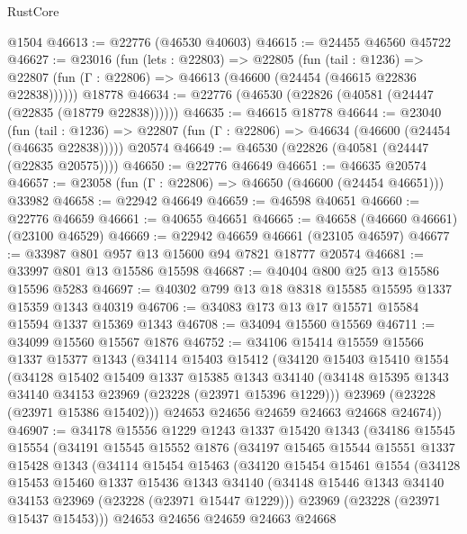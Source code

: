 \begin{lexlean}{RustCore}
\begin{coremodule}
    @1504
@46613 := @22776 (@46530 @40603)
@46615 := @24455 @46560 @45722
@46627 := @23016
    (fun (lets : @22803) =>
    @22805
      (fun (tail : @1236) =>
      @22807 (fun (Γ : @22806) => @46613 (@46600 (@24454 (@46615 @22836 @22838))))))
    @18778
@46634 := @22776 (@46530 (@22826 (@40581 (@24447 (@22835 (@18779 @22838))))))
@46635 := @46615 @18778
@46644 := @23040
    (fun (tail : @1236) => @22807 (fun (Γ : @22806) => @46634 (@46600 (@24454 (@46635 @22838)))))
    @20574
@46649 := @46530 (@22826 (@40581 (@24447 (@22835 @20575))))
@46650 := @22776 @46649
@46651 := @46635 @20574
@46657 := @23058 (fun (Γ : @22806) => @46650 (@46600 (@24454 @46651))) @33982
@46658 := @22942 @46649
@46659 := @46598 @40651
@46660 := @22776 @46659
@46661 := @40655 @46651
@46665 := @46658 (@46660 @46661) (@23100 @46529)
@46669 := @22942 @46659 @46661 (@23105 @46597)
@46677 := @33987 @801 @957 @13 @15600 @94 @7821 @18777 @20574
@46681 := @33997 @801 @13 @15586 @15598
@46687 := @40404 @800 @25 @13 @15586 @15596 @5283
@46697 := @40302 @799 @13 @18 @8318 @15585 @15595 @1337 @15359 @1343 @40319
@46706 := @34083 @173 @13 @17 @15571 @15584 @15594 @1337 @15369 @1343
@46708 := @34094 @15560 @15569
@46711 := @34099 @15560 @15567 @1876
@46752 := @34106
    @15414
    @15559
    @15566
    @1337
    @15377
    @1343
    (@34114
      @15403
      @15412
      (@34120
        @15403
        @15410
        @1554
        (@34128
          @15402
          @15409
          @1337
          @15385
          @1343
          @34140
          (@34148 @15395 @1343 @34140 @34153 @23969 (@23228 (@23971 @15396 @1229)))
          @23969
          (@23228 (@23971 @15386 @15402)))
        @24653
        @24656
        @24659
        @24663
        @24668
        @24674))
@46907 := @34178
    @15556
    @1229
    @1243
    @1337
    @15420
    @1343
    (@34186
      @15545
      @15554
      (@34191
        @15545
        @15552
        @1876
        (@34197
          @15465
          @15544
          @15551
          @1337
          @15428
          @1343
          (@34114
            @15454
            @15463
            (@34120
              @15454
              @15461
              @1554
              (@34128
                @15453
                @15460
                @1337
                @15436
                @1343
                @34140
                (@34148 @15446 @1343 @34140 @34153 @23969 (@23228 (@23971 @15447 @1229)))
                @23969
                (@23228 (@23971 @15437 @15453)))
              @24653
              @24656
              @24659
              @24663
              @24668

\end{coremodule}
\end{lexlean}
